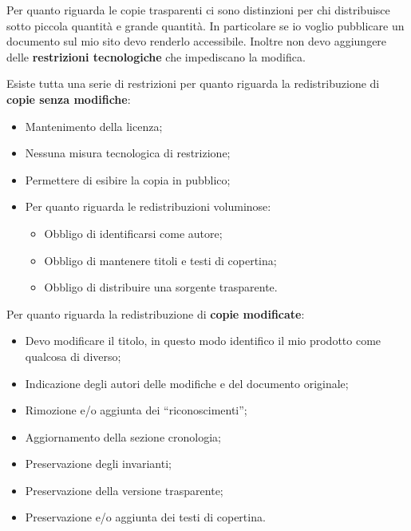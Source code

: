 Per quanto riguarda le copie trasparenti ci sono distinzioni per chi distribuisce sotto piccola quantità e grande quantità. In particolare se io voglio pubblicare un documento sul mio sito devo renderlo accessibile. Inoltre non devo aggiungere delle \textbf{restrizioni tecnologiche} che impediscano la modifica. 

Esiste tutta una serie di restrizioni per quanto riguarda la redistribuzione di \textbf{copie senza modifiche}:

\begin{itemize}

\item Mantenimento della licenza;
\item Nessuna misura tecnologica di restrizione;
\item Permettere di esibire la copia in pubblico;
\item Per quanto riguarda le redistribuzioni voluminose:
	\begin{itemize}

	\item Obbligo di identificarsi come autore;
	\item Obbligo di mantenere titoli e testi di copertina;
	\item Obbligo di distribuire una sorgente trasparente.

	\end{itemize}

\end{itemize}

Per quanto riguarda la redistribuzione di \textbf{copie modificate}:

\begin{itemize}

\item Devo modificare il titolo, in questo modo identifico il mio prodotto come qualcosa di diverso;
\item Indicazione degli autori delle modifiche e del documento originale;
\item Rimozione e/o aggiunta dei ``riconoscimenti'';
\item Aggiornamento della sezione cronologia;
\item Preservazione degli invarianti;
\item Preservazione della versione trasparente;
\item Preservazione e/o aggiunta dei testi di copertina.

\end{itemize}

